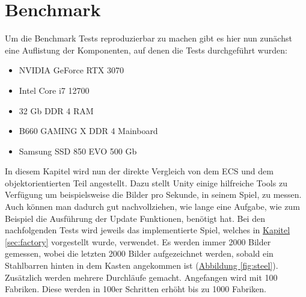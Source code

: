 \section{Benchmark}
Um die Benchmark Tests reproduzierbar zu machen gibt es hier nun zunächst eine Auflistung der Komponenten, auf denen die Tests durchgeführt wurden:
\begin{itemize}
\item NVIDIA GeForce RTX 3070
\item Intel Core i7 12700
\item 32 Gb DDR 4 RAM
\item B660 GAMING X DDR 4 Mainboard
\item Samsung SSD 850 EVO 500 Gb
\end{itemize}
In diesem Kapitel wird nun der direkte Vergleich von dem ECS und dem objektorientierten Teil angestellt. Dazu stellt Unity einige hilfreiche Tools zu Verfügung um beispielsweise die Bilder pro Sekunde, in seinem Spiel, zu messen. Auch können man dadurch gut nachvollziehen, wie lange eine Aufgabe, wie zum Beispiel die Ausführung der Update Funktionen, benötigt hat. Bei den nachfolgenden Tests wird jeweils das implementierte Spiel, welches in \hyperref[sec:factory]{Kapitel \ref*{sec:factory}} vorgestellt wurde, verwendet. Es werden immer 2000 Bilder gemessen, wobei die letzten 2000 Bilder aufgezeichnet werden, sobald ein Stahlbarren hinten in dem Kasten angekommen ist (\hyperref[fig:steel]{Abbildung \ref*{fig:steel}}). Zusätzlich werden mehrere Durchläufe gemacht. Angefangen wird mit 100 Fabriken. Diese werden in 100er Schritten erhöht bis zu 1000 Fabriken.
